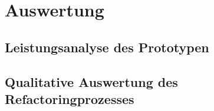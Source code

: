 \chapter{Auswertung}
\label{chap:auswertung}

\section{Leistungsanalyse des Prototypen}

\section{Qualitative Auswertung des Refactoringprozesses}
